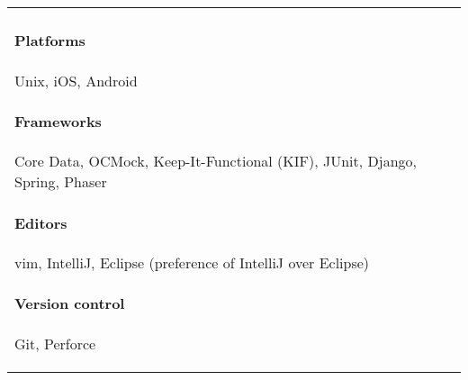 \documentclass[letterpaper,10pt]{article} %
\begin{document}
\begin{tabular}{ll}
\begin{minipage}[t]{3.75in}
        \paragraph{Platforms} Unix, iOS, Android
        \paragraph{Frameworks} Core Data, OCMock, Keep-It-Functional (KIF), JUnit, {\footnotesize Django, Spring, Phaser}
        \paragraph{Editors} vim, IntelliJ, Eclipse {\footnotesize (preference of IntelliJ over Eclipse)}
        \paragraph{Version control} Git, Perforce
    \end{minipage}
\end{tabular}
\end{document}
